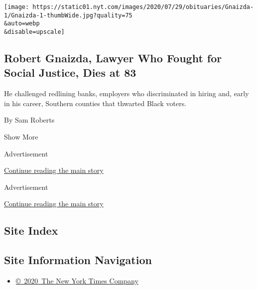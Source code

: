 \begin{enumerate}
  \texttt{[image: https://static01.nyt.com/images/2020/07/29/obituaries/Gnaizda-1/Gnaizda-1-thumbWide.jpg?quality=75\\\&auto=webp\\\&disable=upscale]}

  \hypertarget{robert-gnaizda-lawyer-who-fought-for-social-justice-dies-at-83}{%
  \subsection{Robert Gnaizda, Lawyer Who Fought for Social Justice, Dies
  at
  83}\label{robert-gnaizda-lawyer-who-fought-for-social-justice-dies-at-83}}

  He challenged redlining banks, employers who discriminated in hiring
  and, early in his career, Southern counties that thwarted Black
  voters.

  By Sam Roberts
\end{enumerate}

Show More

Advertisement

\protect\hyperlink{after-mid2}{Continue reading the main story}

Advertisement

\protect\hyperlink{after-mktg}{Continue reading the main story}

\hypertarget{site-index}{%
\subsection{Site Index}\label{site-index}}

\hypertarget{site-information-navigation}{%
\subsection{Site Information
Navigation}\label{site-information-navigation}}

\begin{itemize}
\tightlist
\item
  \href{https://help.nytimes.com/hc/en-us/articles/115014792127-Copyright-notice}{©~2020~The
  New York Times Company}
\end{itemize}

